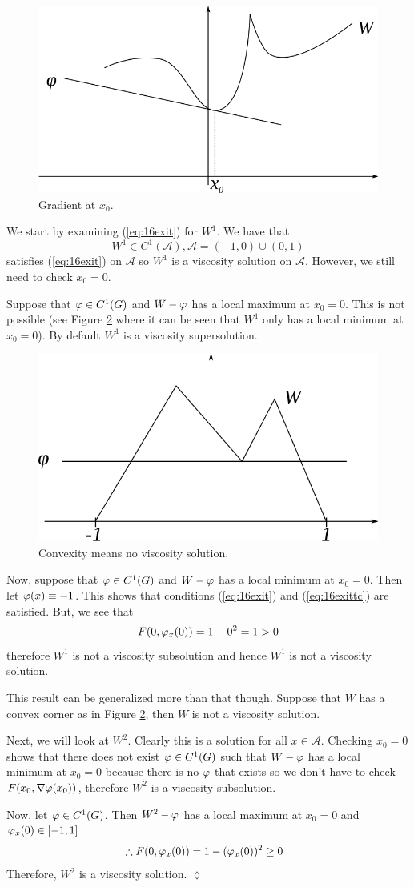 \begin{figure}[ht!]
	\centering
	\includegraphics[width=.4\textwidth]{images/16x0}
	\caption{Gradient at $x_0$.}
	\label{fig:16x0}
\end{figure}

\begin{example}
We start by examining (\ref{eq:16exit}) for $W^1$. We have that
$$W^1\in C^1(\mathcal{A}), \mathcal{A}=(-1,0)\cup(0,1)$$
satisfies (\ref{eq:16exit}) on $\mathcal{A}$ so $W^1$ is a viscosity solution on $\mathcal{A}$. However, we still need to check $x_0=0$.

Suppose that $\varphi\in C^1(G)$ and $W-\varphi$ has a local maximum at $x_0=0$. This is not possible (see Figure \ref{fig:16vs} where it can be seen that $W^1$ only has a local minimum at $x_0=0$). By default $W^1$ is a viscosity supersolution.

\begin{figure}[ht!]
	\centering
	\includegraphics[width=.4\textwidth]{images/16vs}
	\caption{Convexity means no viscosity solution.}
	\label{fig:16vs}
\end{figure}

Now, suppose that $\varphi\in C^1(G)$ and $W-\varphi$ has a local minimum at $x_0=0$. Then let $\varphi(x)\equiv-1$. This shows that conditions (\ref{eq:16exit}) and (\ref{eq:16exittc}) are satisfied. But, we see that
$$F(0,\varphi_x(0))=1-0^2=1>0$$
therefore $W^1$ is not a viscosity subsolution and hence $W^1$ is not a viscosity solution.

This result can be generalized more than that though. Suppose that $W$ has a convex corner as in Figure \ref{fig:16vs}, then $W$ is not a viscosity solution.

Next, we will look at $W^2$. Clearly this is a solution for all $x\in\mathcal{A}$. Checking $x_0=0$ shows that there does not exist $\varphi\in C^1(G)$ such that $W-\varphi$ has a local minimum at $x_0=0$ because there is no $\varphi$ that exists so we don't have to check $F(x_0,\nabla\varphi(x_0))$, therefore $W^2$ is a viscosity subsolution.

Now, let $\varphi\in C^1(G)$. Then $W^2-\varphi$ has a local maximum at $x_0=0$ and $\varphi_x(0)\in[-1,1]$
\begin{align*}
&\therefore F(0,\varphi_x(0)) = 1-(\varphi_x(0))^2\geq0
\end{align*}
Therefore, $W^2$ is a viscosity solution.
$\lozenge$
\end{example}

